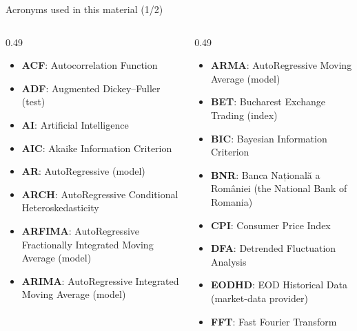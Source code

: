 {
\begin{frame}[noframenumbering]
    \titlepage
\end{frame}
}
\begin{frame}{Acronyms used in this material (1/2)}
\begin{columns}[T]
\begin{column}{0.49\textwidth}
\begin{itemize}\setlength{\itemsep}{0pt}
    \item \textbf{ACF}: Autocorrelation Function
    \item \textbf{ADF}: Augmented Dickey–Fuller (test)
    \item \textbf{AI}: Artificial Intelligence
    \item \textbf{AIC}: Akaike Information Criterion
    \item \textbf{AR}: AutoRegressive (model)
    \item \textbf{ARCH}: AutoRegressive Conditional Heteroskedasticity
    \item \textbf{ARFIMA}: AutoRegressive Fractionally Integrated Moving Average (model)
    \item \textbf{ARIMA}: AutoRegressive Integrated Moving Average (model)
\end{itemize}
\end{column}
\begin{column}{0.49\textwidth}
\begin{itemize}\setlength{\itemsep}{0pt}
    \item \textbf{ARMA}: AutoRegressive Moving Average (model)
    \item \textbf{BET}: Bucharest Exchange Trading (index)
    \item \textbf{BIC}: Bayesian Information Criterion
    \item \textbf{BNR}: Banca Națională a României (the National Bank of Romania)
    \item \textbf{CPI}: Consumer Price Index
    \item \textbf{DFA}: Detrended Fluctuation Analysis
    \item \textbf{EODHD}: EOD Historical Data (market-data provider)
    \item \textbf{FFT}: Fast Fourier Transform
\end{itemize}
\end{column}
\end{columns}
\end{frame}

